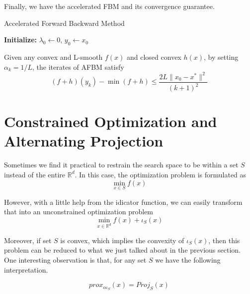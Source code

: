 Finally, we have the accelerated FBM and its convergence guarantee.

\begin{minipage}{0.8\textwidth}  %
    \centering
    \begin{algorithm}[H]
        \caption{Accelerated Forward Backward Method}
    
        \textbf{Initialize:} $\lambda_0 \gets 0$, $y_0 \gets x_0$\;
    
    \end{algorithm}
    \vspace{2em}
\end{minipage}

\begin{theorem}
    Given any convex and L-smooth $f(x)$ and closed convex $h(x)$, by setting $\alpha_k = 1/L$, the iterates of AFBM satisfy
    \begin{equation*}
        (f+h)(y_k) - \min(f+h) \leq \frac{2L \|x_0 - x^*\|^2}{(k+1)^2}
    \end{equation*}
\end{theorem}

\section{Constrained Optimization and Alternating Projection}
Sometimes we find it practical to restrain the search space to be within a set $S$ instead of the entire $\mathbb{R}^d$. In this case, the optimization problem is formulated as
\begin{equation*}
    \min_{x \in S} f(x)
\end{equation*}

However, with a little help from the idicator function, we can easily transform that into an unconstrained optimization problem
\begin{equation*}
    \min_{x \in \mathbb{R}^d} f(x) + \iota_S(x)
\end{equation*}

Moreover, if set $S$ is convex, which implies the convexity of $\iota_S(x)$, then this problem can be reduced to what we just talked about in the previous section. One interesting observation is that, for any set $S$ we have the following interpretation.
\begin{lemma}
    $$prox_{\alpha \iota_S}(x) = Proj_S(x)$$
\end{lemma}


